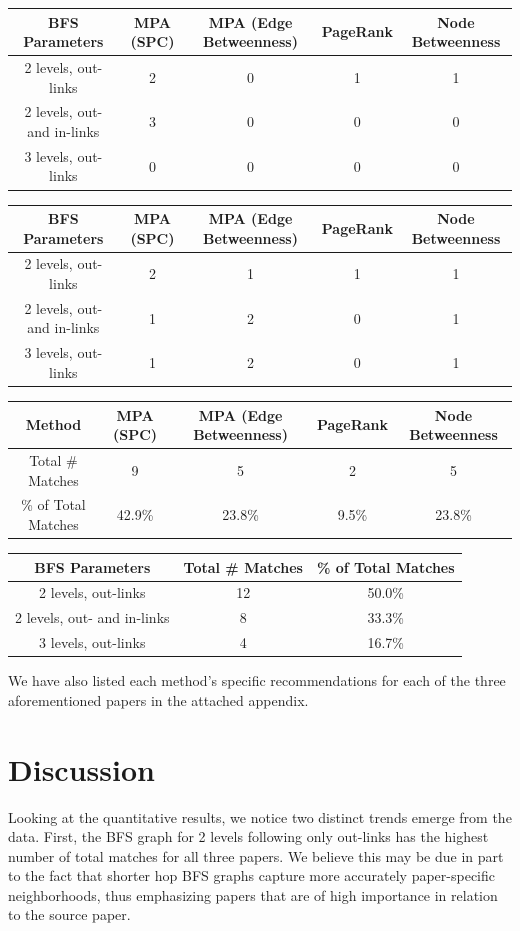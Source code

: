 \documentclass[lettepaper,]{article}
\begin{document}
\begin{longtable}[]{@{}ccccc@{}}
\toprule
BFS Parameters & MPA (SPC) & MPA (Edge Betweenness) & PageRank & Node
Betweenness\tabularnewline
\midrule
\endhead
2 levels, out-links & 2 & 0 & 1 & 1\tabularnewline
2 levels, out- and in-links & 3 & 0 & 0 & 0\tabularnewline
3 levels, out-links & 0 & 0 & 0 & 0\tabularnewline
\bottomrule
\end{longtable}

\begin{longtable}[]{@{}ccccc@{}}
\toprule
BFS Parameters & MPA (SPC) & MPA (Edge Betweenness) & PageRank & Node
Betweenness\tabularnewline
\midrule
\endhead
2 levels, out-links & 2 & 1 & 1 & 1\tabularnewline
2 levels, out- and in-links & 1 & 2 & 0 & 1\tabularnewline
3 levels, out-links & 1 & 2 & 0 & 1\tabularnewline
\bottomrule
\end{longtable}

\begin{longtable}[]{@{}ccccc@{}}
\toprule
Method & MPA (SPC) & MPA (Edge Betweenness) & PageRank & Node
Betweenness\tabularnewline
\midrule
\endhead
Total \# Matches & 9 & 5 & 2 & 5\tabularnewline
\% of Total Matches & 42.9\% & 23.8\% & 9.5\% & 23.8\%\tabularnewline
\bottomrule
\end{longtable}

\begin{longtable}[]{@{}ccc@{}}
\toprule
BFS Parameters & Total \# Matches & \% of Total Matches\tabularnewline
\midrule
\endhead
2 levels, out-links & 12 & 50.0\%\tabularnewline
2 levels, out- and in-links & 8 & 33.3\%\tabularnewline
3 levels, out-links & 4 & 16.7\%\tabularnewline
\bottomrule
\end{longtable}

We have also listed each method's specific recommendations for each of
the three aforementioned papers in the attached appendix.

\hypertarget{discussion}{%
\section{Discussion}\label{discussion}}

Looking at the quantitative results, we notice two distinct trends
emerge from the data. First, the BFS graph for 2 levels following only
out-links has the highest number of total matches for all three papers.
We believe this may be due in part to the fact that shorter hop BFS
graphs capture more accurately paper-specific neighborhoods, thus
emphasizing papers that are of high importance in relation to the source
paper.
\end{document}
